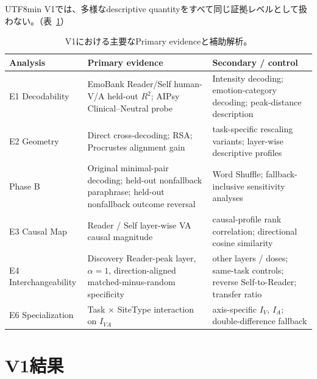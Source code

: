 \documentclass{article} %
\begin{document}
\begin{CJK*}{UTF8}{min}
V1では、多様なdescriptive quantityをすべて同じ証拠レベルとして扱わない。（表~\ref{tab:v1-primary-secondary}）

\begin{table}[htbp]
\centering
\small
\caption{V1における主要なPrimary evidenceと補助解析。}
\label{tab:v1-primary-secondary}
\begin{tabularx}{\linewidth}{
@{}
>{\raggedright\arraybackslash}p{2.3cm}
>{\raggedright\arraybackslash}p{3.8cm}
>{\raggedright\arraybackslash}X
@{}
}
\toprule
\textbf{Analysis} &
\textbf{Primary evidence} &
\textbf{Secondary / control} \\
\midrule
E1 Decodability &
EmoBank Reader/Self human-V/A held-out \(R^2\);
AIPsy Clinical--Neutral probe &
Intensity decoding;
emotion-category decoding;
peak-distance description \\

E2 Geometry &
Direct cross-decoding;
RSA;
Procrustes alignment gain &
task-specific rescaling variants;
layer-wise descriptive profiles \\

Phase B &
Original minimal-pair decoding;
held-out nonfallback paraphrase;
held-out nonfallback outcome reversal &
Word Shuffle;
fallback-inclusive sensitivity analyses \\

E3 Causal Map &
Reader / Self layer-wise VA causal magnitude &
causal-profile rank correlation;
directional cosine similarity \\

E4 Interchangeability &
Discovery Reader-peak layer,
\(\alpha=1\),
direction-aligned matched-minus-random specificity &
other layers / doses;
same-task controls;
reverse Self-to-Reader;
transfer ratio \\

E6 Specialization &
Task \(\times\) SiteType interaction on \(I_{VA}\) &
axis-specific \(I_V\), \(I_A\);
double-difference fallback \\
\bottomrule
\end{tabularx}
\end{table}





\section{V1結果}
\label{sec:v1-results}


\end{CJK*}
\end{document}
